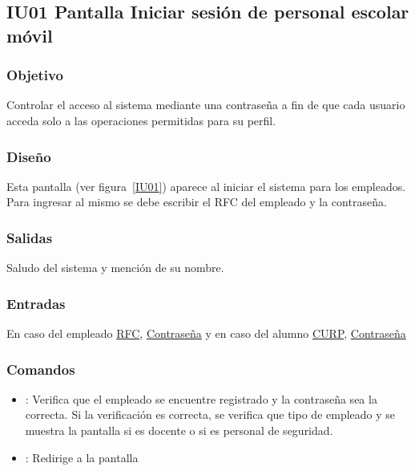 
\subsection{IU01 Pantalla Iniciar sesión de personal escolar móvil} 

\subsubsection{Objetivo}
	Controlar el acceso al sistema mediante una contraseña a fin de que cada usuario acceda solo a las operaciones permitidas para su perfil.

\subsubsection{Diseño}
	Esta pantalla  (ver figura~\ref{IU01}) aparece al iniciar el sistema para los empleados. Para ingresar al mismo se debe escribir el RFC del empleado y la contraseña. 


\subsubsection{Salidas}

Saludo del sistema y mención de su nombre.

\subsubsection{Entradas}
En caso del empleado \hyperlink{Empleado.RFC}{RFC}, \hyperlink{Empleado.Contraseña}{Contraseña} y en caso del alumno \hyperlink{Alumn.CURP}{CURP}, \hyperlink{Alumno.Contraseña}{Contraseña} 

\subsubsection{Comandos}
\begin{itemize}
	\item {}: Verifica que el empleado se encuentre registrado y la contraseña sea la correcta. Si la verificación es correcta, se verifica que tipo de empleado y se muestra la pantalla  si es docente o  si es personal de seguridad.
	
	\item {}: Redirige a la pantalla 
	
\end{itemize}

